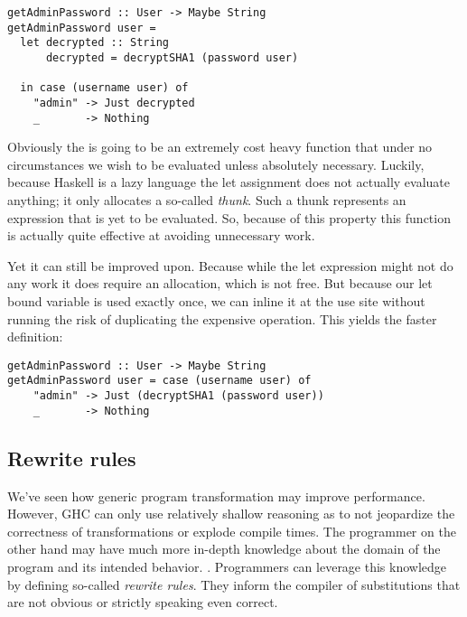 \begin{listing}[H]
\begin{verbatim}
getAdminPassword :: User -> Maybe String
getAdminPassword user = 
  let decrypted :: String
      decrypted = decryptSHA1 (password user)

  in case (username user) of
    "admin" -> Just decrypted
    _       -> Nothing
\end{verbatim}
\end{listing}

Obviously the  is going to be an extremely cost heavy function that under no
circumstances we wish to be evaluated unless absolutely necessary. Luckily, because Haskell is a
lazy language the let assignment does not actually evaluate anything; it only allocates a so-called
\textit{thunk}. Such a thunk represents an expression that is yet to be evaluated. So, because of
this property this function is actually quite effective at avoiding unnecessary work. 

Yet it can still
be improved upon. Because while the let expression might not do any work it does require an allocation,
which is not free. But because our let bound variable  is used exactly once, we can inline
it at the use site without running the risk of duplicating the expensive operation. This yields the faster
definition:

\begin{listing}[H]
\begin{verbatim}
getAdminPassword :: User -> Maybe String
getAdminPassword user = case (username user) of
    "admin" -> Just (decryptSHA1 (password user))
    _       -> Nothing
\end{verbatim}
\end{listing}


\subsection{Rewrite rules}

We've seen how generic program transformation may improve performance. However, GHC can only use relatively
shallow reasoning as to not jeopardize the correctness of transformations or explode compile times. 
The programmer on the other hand may have much more in-depth knowledge about the domain of the program 
and its intended behavior. \cite{playing_by_the_rules}.
Programmers can leverage this knowledge by defining so-called \textit{rewrite rules}. They inform the compiler of
substitutions that are not obvious or strictly speaking even correct.  

